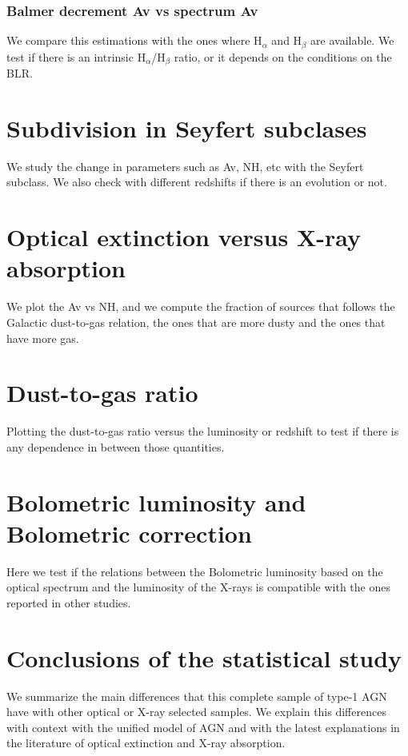 \subsubsection{Balmer decrement Av vs spectrum Av}

We compare this estimations with the ones where H$_{\alpha}$ and H$_{\beta}$ are available. We test if there is an intrinsic H$_{\alpha}$/H$_{\beta}$ ratio, or it depends on the conditions on the BLR.



\section{Subdivision in Seyfert subclases}

We study the change in parameters such as Av, NH, etc with the Seyfert subclass. We also check with different redshifts if there is an evolution or not.


\section{Optical extinction versus X-ray absorption}

We plot the Av vs NH, and we compute the fraction of sources that follows the Galactic dust-to-gas relation, the ones that are more dusty and the ones that have more gas.

\section{Dust-to-gas ratio}

Plotting the dust-to-gas ratio versus the luminosity or redshift to test if there is any dependence in between those quantities.



\section{Bolometric luminosity and Bolometric correction}

Here we test if the relations between the Bolometric luminosity based on the optical spectrum and the luminosity of the X-rays is compatible with the ones reported in other studies.



\section{Conclusions of the statistical study}

We summarize the main differences that this complete sample of type-1 AGN have with other optical or X-ray selected samples. We explain this differences with context with the unified model of AGN and with the latest explanations in the literature of optical extinction and X-ray absorption.





 